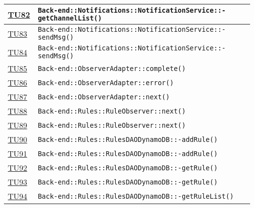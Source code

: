 \begin{longtable}{|>{\centering}m{1cm}|m{12cm}<{\centering}|}
\hyperlink{TU82}{TU82} & \texttt{Back-end::Notifications::NotificationService::-\linebreak getChannelList()}\\ \hline

\hyperlink{TU83}{TU83} & \texttt{Back-end::Notifications::NotificationService::-\linebreak sendMsg()}\\ \hline

\hyperlink{TU84}{TU84} & \texttt{Back-end::Notifications::NotificationService::-\linebreak sendMsg()}\\ \hline

\hyperlink{TU85}{TU85} & \texttt{Back-end::ObserverAdapter::complete()}\\ \hline

\hyperlink{TU86}{TU86} & \texttt{Back-end::ObserverAdapter::error()}\\ \hline

\hyperlink{TU87}{TU87} & \texttt{Back-end::ObserverAdapter::next()}\\ \hline

\hyperlink{TU88}{TU88} & \texttt{Back-end::Rules::RuleObserver::next()}\\ \hline

\hyperlink{TU89}{TU89} & \texttt{Back-end::Rules::RuleObserver::next()}\\ \hline

\hyperlink{TU90}{TU90} & \texttt{Back-end::Rules::RulesDAODynamoDB::-\linebreak addRule()}\\ \hline

\hyperlink{TU91}{TU91} & \texttt{Back-end::Rules::RulesDAODynamoDB::-\linebreak addRule()}\\ \hline

\hyperlink{TU92}{TU92} & \texttt{Back-end::Rules::RulesDAODynamoDB::-\linebreak getRule()}\\ \hline

\hyperlink{TU93}{TU93} & \texttt{Back-end::Rules::RulesDAODynamoDB::-\linebreak getRule()}\\ \hline

\hyperlink{TU94}{TU94} & \texttt{Back-end::Rules::RulesDAODynamoDB::-\linebreak getRuleList()}\\ \hline


\end{longtable}
